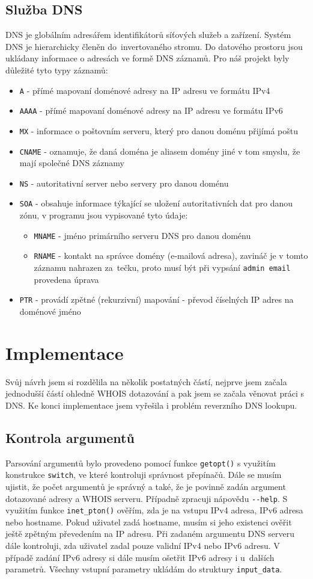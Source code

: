 \documentclass[a4paper, 11pt]{article}
\begin{document}
 \subsection{Služba DNS}
 DNS je globálním adresářem identifikátorů síťových služeb a zařízení. Systém DNS je hierarchicky členěn do~invertovaného stromu. Do datového prostoru jsou ukládany informace o adresách ve formě DNS záznamů. Pro náš projekt byly důležité tyto typy záznamů\cite{Matousek:Sitove}:
  \begin{itemize}
 \item \verb|A| - přímé mapovaní doménové adresy na IP adresu ve formátu IPv4
 \item \verb|AAAA| - přímé mapovaní doménové adresy na IP adresu ve formátu IPv6
 \item \verb|MX| - informace o poštovním serveru, který pro danou doménu přijímá poštu
 \item \verb|CNAME| - oznamuje, že daná doména je aliasem domény jiné v tom smyslu, že mají společné DNS záznamy
 \item \verb|NS| - autoritativní server nebo servery pro danou doménu
 \item \verb|SOA| - obsahuje informace týkající se uložení autoritativních dat pro danou zónu, v programu jsou vypisované tyto údaje:
  \begin{itemize}
  \item \verb|MNAME| - jméno primárního serveru DNS pro danou doménu
  \item \verb|RNAME| - kontakt na správce domény (e-mailová adresa), zavináč je v tomto záznamu nahrazen za~tečku, proto musí být při vypsání \verb|admin email| provedena úprava
  \end{itemize}
   \item \verb|PTR| - provádí zpětné (rekurzivní) mapování - převod číselných IP adres na doménové jméno
 \end{itemize}
 
 \section{Implementace}
 Svůj návrh jsem si rozdělila na několik postatných částí, nejprve jsem začala jednodušší částí ohledně WHOIS dotazování a pak jsem se začala věnovat práci s DNS. Ke konci implementace jsem vyřešila i problém reverzního DNS lookupu.
 \subsection{Kontrola argumentů}
 Parsování argumentů bylo provedeno pomocí funkce \verb|getopt()| s využitím konstrukce \verb|switch|, ve které kontroluji správnost přepínačů. Dále se musím ujistit, že počet argumentů je správný a také, že je povinně zadán argument dotazované adresy a WHOIS serveru. Případně zpracuji nápovědu \verb|--help|. S využitím funkce \verb|inet_pton()| ověřím, zda je na vstupu IPv4 adresa, IPv6 adresa nebo hostname. Pokud uživatel zadá hostname, musím si jeho existenci ověřit ještě zpětným převedením na IP adresu. Při zadaném argumentu DNS serveru dále kontroluji, zda uživatel zadal pouze validní IPv4 nebo IPv6 adresu. V případě zadání IPv6 adresy si dále musím ošetřit IPv6 adresy i u~dalších parametrů. Všechny vstupní parametry ukládám do struktury \verb|input_data|.
\end{document}
